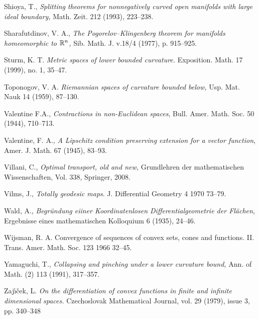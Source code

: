 \begin{thebibliography}{52}
  Shioya, T., \textit{Splitting theorems for nonnegatively curved open manifolds with large ideal boundary,} Math. Zeit. 212 (1993), 223--238.

Sharafutdinov, V. A., 
\textit{The Pogorelov--Klingenberg theorem for manifolds homeomorphic to $\mathbb{R}^n$,} 
Sib. Math. J. v.18/4 (1977), p. 915--925.

Sturm, K. T. \textit{Metric spaces of lower bounded curvature.}  
Exposition. Math.  17  (1999),  no. 1, 35--47.

  Toponogov, V. A. \textit{Riemannian spaces of curvature bounded below,} Usp. Mat. Nauk 14 (1959), 87--130.

 Valentine F.A., 
\textit{Contractions in non-Euclidean spaces}, Bull. Amer. Math. Soc. 50 (1944), 710--713.

 Valentine, F. A., 
\textit{A Lipschitz condition preserving extension for a vector
function}, Amer. J. Math. 67 (1945), 83--93.

 Villani, C., \textit{Optimal transport, old and new,} Grundlehren der mathematischen Wissenschaften, Vol. 338, Springer, 2008.

 Vilms, J., \textit{Totally geodesic maps}.
J. Differential Geometry 4 1970 73--79. 

 Wald, A., \textit{Begr\"undung eiiner Koordinatenlosen Differentialgeometrie der Fl\"achen}, Ergebnisse eines mathematischen Kolloquium
6  (1935), 24--46.



 Wijsman, R. A. Convergence of sequences of convex sets, cones and functions. II. Trans. Amer. Math. Soc. 123 1966 32--45.

 Yamaguchi, T., \textit{Collapsing and pinching under a lower curvature
bound,} Ann. of Math. (2) 113 (1991), 317--357.

 Zaj\'{\i}\v{c}ek, L. \textit{On the differentiation of convex functions in finite and infinite dimensional spaces.} Czechoslovak Mathematical Journal, vol. 29 (1979), issue 3, pp. 340--348
\end{thebibliography}